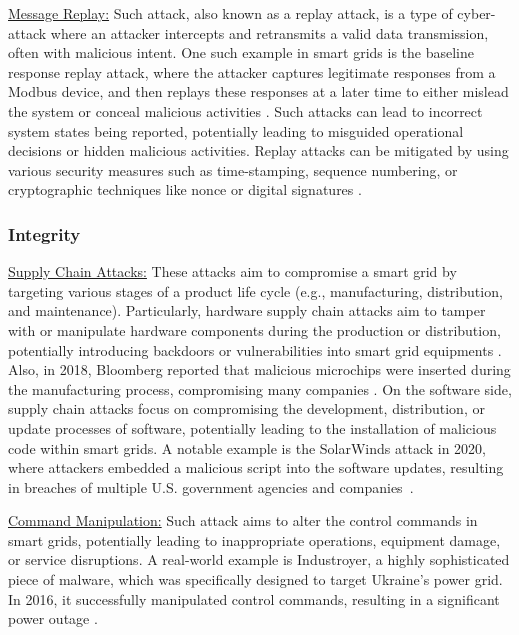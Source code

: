 \documentclass[10pt, journal]{IEEEtran}
\begin{document}
\underline{Message Replay:} Such attack, also known as a replay attack, is a type of cyber-attack where an attacker intercepts and retransmits a valid data transmission, often with malicious intent. One such example in smart grids is the baseline response replay attack, where the attacker captures legitimate responses from a Modbus device, and then replays these responses at a later time to either mislead the system or conceal malicious activities \cite{huitsing2008attack, radoglou2020implementation, aloul2012smart}. Such attacks can lead to incorrect system states being reported, potentially leading to misguided operational decisions or hidden malicious activities. Replay attacks can be mitigated by using various security measures such as time-stamping, sequence numbering, or cryptographic techniques like nonce or digital signatures \cite{baig2013analysis}.
		
\subsubsection{Integrity}

\underline{Supply Chain Attacks:} These attacks aim to compromise a smart grid by targeting various stages of a product life cycle (e.g., manufacturing, distribution, and maintenance)\cite{duman2019modeling}. Particularly, hardware supply chain attacks aim to tamper with or manipulate hardware components during the production or distribution, potentially introducing backdoors or vulnerabilities into smart grid equipments \cite{rao2021iot}. Also, in 2018, Bloomberg reported that malicious microchips were inserted during the manufacturing process, compromising many companies \cite{businessweek2018big}. On the software side, supply chain attacks focus on compromising the development, distribution, or update processes of software, potentially leading to the installation of malicious code within smart grids. A notable example is the SolarWinds attack in 2020, where attackers embedded a malicious script into the software updates, resulting in breaches of multiple U.S. government agencies and companies~\cite{wolff2021navigating}.

\underline{Command Manipulation:} Such attack aims to alter the control commands in smart grids, potentially leading to inappropriate operations, equipment damage, or service disruptions\cite{musleh2019survey}. A real-world example is Industroyer, a highly sophisticated piece of malware, which was specifically designed to target Ukraine's power grid. In 2016, it successfully manipulated control commands, resulting in a significant power outage \cite{cherepanov2017industroyer}.
			
\end{document}
